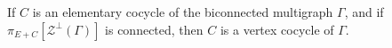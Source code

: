 If $C$ is an elementary cocycle of the biconnected multigraph $\Gamma$, and if $\pi_{E+C}[\mathcal{Z}^{\perp}(\Gamma)]$ is connected, then $C$ is a vertex cocycle of $\Gamma$.
